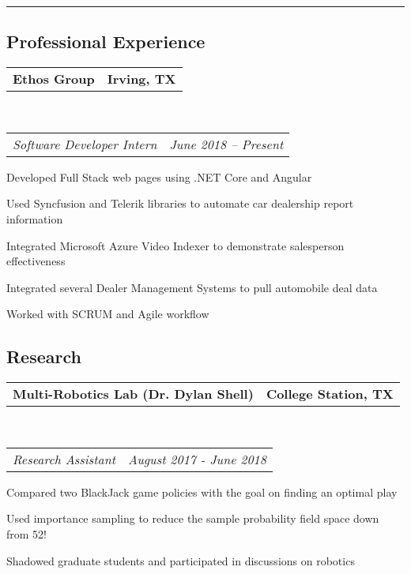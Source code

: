 \documentclass[10pt,letterpaper]{article}
\makeatletter
\newenvironment{indentsection}[1]%
{\begin{list}{}%
	{\setlength{\leftmargin}{#1}}%
	\item[]%
}
{\end{list}}
\newcommand{\headerrow}[2]
{\begin{tabular*}{\linewidth}{l@{\extracolsep{\fill}}r}
	#1 &
	#2 \\
\end{tabular*}}
\makeatother
\begin{document}
\hrule
\vspace{-0.8em}
\subsection*{Professional Experience}
\begin{indentsection}{\parindent}
	\vspace{-0.4em}
	\headerrow
		{\textbf{Ethos Group}}
		{\textbf{Irving, TX}}
	\\
	\headerrow
		{\emph{Software Developer Intern}}
		{\emph{June 2018 -- Present}}
	\begin{itemize*}
		\item Developed Full Stack web pages using .NET Core and Angular 
		\item Used Syncfusion and Telerik libraries to automate car dealership report information
		\item Integrated Microsoft Azure Video Indexer to demonstrate salesperson effectiveness 
		\item Integrated several Dealer Management Systems to pull automobile deal data
		\item Worked with SCRUM and Agile workflow
	\end{itemize*}
\end{indentsection}

\vspace{-1.8em}
\subsection*{Research}
\begin{indentsection}{\parindent}
	\vspace{-0.4em}
	\headerrow
		{\textbf{Multi-Robotics Lab (Dr. Dylan Shell)}}
		{\textbf{College Station, TX}}
	\\
	\headerrow
		{\emph{Research Assistant}}
		{\emph{August 2017 - June 2018}}
	\begin{itemize*}
		\item Compared two BlackJack game policies with the goal on finding an optimal play 
		\item Used importance sampling to reduce the sample probability field space down from 52!
		\item Shadowed graduate students and participated in discussions on robotics 
	\end{itemize*}
\end{indentsection}

\vspace{-1.8em}
\end{document}
